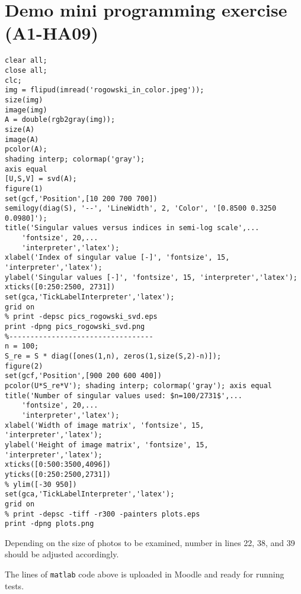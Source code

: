 \documentclass[12pt]{article}
\begin{document}
\section{Demo mini programming exercise (A1-HA09)}
\begin{lstlisting}
clear all;
close all;
clc;
img = flipud(imread('rogowski_in_color.jpeg'));
size(img)
image(img)
A = double(rgb2gray(img));
size(A)
image(A)
pcolor(A); 
shading interp; colormap('gray'); 
axis equal
[U,S,V] = svd(A);
figure(1)
set(gcf,'Position',[10 200 700 700])
semilogy(diag(S), '--', 'LineWidth', 2, 'Color', '[0.8500 0.3250 0.0980]');
title('Singular values versus indices in semi-log scale',...
    'fontsize', 20,...
    'interpreter','latex');
xlabel('Index of singular value [-]', 'fontsize', 15, 'interpreter','latex');
ylabel('Singular values [-]', 'fontsize', 15, 'interpreter','latex');
xticks([0:250:2500, 2731])
set(gca,'TickLabelInterpreter','latex');
grid on
% print -depsc pics_rogowski_svd.eps
print -dpng pics_rogowski_svd.png
%----------------------------------
n = 100;
S_re = S * diag([ones(1,n), zeros(1,size(S,2)-n)]);
figure(2)
set(gcf,'Position',[900 200 600 400])
pcolor(U*S_re*V'); shading interp; colormap('gray'); axis equal
title('Number of singular values used: $n=100/2731$',...
    'fontsize', 20,...
    'interpreter','latex');
xlabel('Width of image matrix', 'fontsize', 15, 'interpreter','latex');
ylabel('Height of image matrix', 'fontsize', 15, 'interpreter','latex');
xticks([0:500:3500,4096])
yticks([0:250:2500,2731])
% ylim([-30 950])
set(gca,'TickLabelInterpreter','latex');
grid on
% print -depsc -tiff -r300 -painters plots.eps
print -dpng plots.png
\end{lstlisting}
\begin{remarkboxed}
	Depending on the size of photos to be examined,
	number in lines 22, 38, and 39 should be adjusted accordingly. 
\end{remarkboxed}
\begin{remarkboxed}
	The lines of \texttt{matlab} code above is uploaded in Moodle
	and ready for running tests.
\end{remarkboxed}


% 
\end{document}
